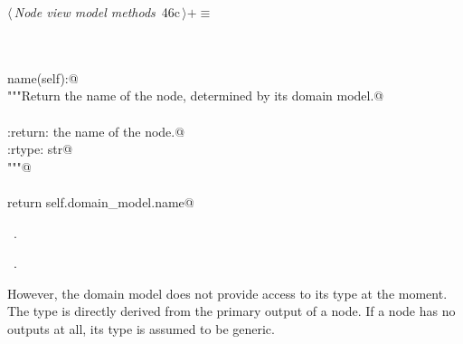 \documentclass[
    a4paper,      %
    10pt,         %
    openright,    %
    notitlepage,  %
    parskip=half, %
]{scrreprt}       %
\theoremstyle{definition}                    %
\begin{document}
\begin{flushleft} \small
\begin{minipage}{\linewidth}\label{scrap62}\raggedright\small
{} $\langle\,${\itshape Node view model methods}\nobreak\ {\footnotesize {46c}}$\,\rangle+\equiv$
\vspace{-1ex}
\begin{list}{}{} \item
\mbox{}\lstinline@@\\
\mbox{}\lstinline@property@\\
\mbox{}\lstinline@def name(self):@\\
\mbox{}\lstinline@    """Return the name of the node, determined by its domain model.@\\
\mbox{}\lstinline@@\\
\mbox{}\lstinline@    :return: the name of the node.@\\
\mbox{}\lstinline@    :rtype: str@\\
\mbox{}\lstinline@    """@\\
\mbox{}\lstinline@@\\
\mbox{}\lstinline@    return self.domain_model.name@\\
\mbox{}\lstinline@@{\NWsep}
\end{list}
\vspace{-1.5ex}
\footnotesize
\begin{list}{}{\setlength{\itemsep}{-\parsep}\setlength{\itemindent}{-\leftmargin}}
\item \NWtxtMacroDefBy\ .
\item \NWtxtMacroRefIn\ .

\item{}
\end{list}
\end{minipage}\vspace{4ex}
\end{flushleft}
However, the domain model does not provide access to its type at the moment. The
type is directly derived from the primary output of a node. If a node has no
outputs at all, its type is assumed to be generic.
\end{document}
